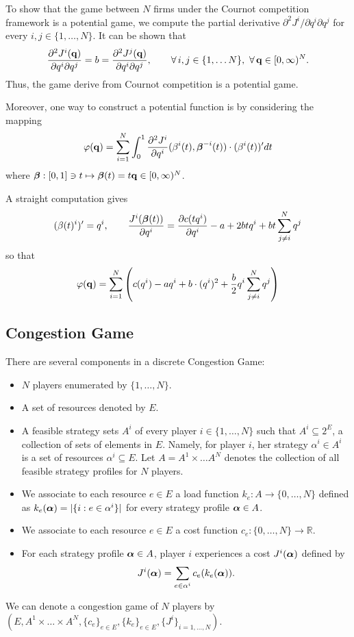 To show that the game between $N$ firms under the Cournot competition framework is a potential game, we compute the partial derivative $\partial^2 J^i/ \partial q^i \partial q^j$ for every $i,j \in \{1,\ldots, N\}$.
It can be shown that
\begin{equation*}
	\frac{\partial^2 J^i(\mathbf{q})}{\partial q^i \partial q^j} = b = 	\frac{\partial^2 J^j(\mathbf{q})}{\partial q^i \partial q^j} , \qquad \forall \, i,j \in \{1,\ldots N\}, \  \forall \, \mathbf{q} \in [0,\infty)^N.
\end{equation*}
Thus, the game derive from Cournot competition is a potential game.

Moreover, one way to construct a potential function is by considering the mapping
$$
	\varphi(\mathbf{q}) = \sum_{i=1}^N \int_0^1 	\frac{\partial^2 J^i}{\partial q^i}(\beta^i(t), \boldsymbol{\beta}^{-i}(t)) \cdot (\beta^i(t))' dt 
$$
where $\boldsymbol{\beta}: [0,1] \ni t \mapsto \boldsymbol{\beta}(t) = t\mathbf{q} \in [0,\infty)^N$.

A straight computation gives
$$
	(\beta(t)^i)' = q^i, \qquad \frac{J^i(\boldsymbol{\beta}(t))}{\partial q^i} = \frac{\partial c(t q^i)}{\partial q^i}  - a + 2b t q^i + bt \sum_{j\neq i}^N q^j
$$
so that
$$
	\varphi(\mathbf{q}) = \sum_{i=1}^N \left(c(q^i) - a q^i + b \cdot (q^i)^2 + \frac{b}{2} q^i \sum_{j\neq i}^N q^j \right)
$$

\subsection{Congestion Game}

There are several components in a discrete Congestion Game:
\begin{itemize}
	\item $N$ players enumerated by $\{1,\ldots, N\}$.
	\item A set of resources denoted by $E$.
	\item A feasible strategy sets $A^i$ of every player $i \in \{1,\ldots, N\}$ such that $A^{i} \subseteq 2^E$, a collection of sets of elements in $E$.  Namely, for player $i$, her strategy $\alpha^i \in A^i$ is a set of resources $\alpha^i \subseteq E$. Let  $A = A^1 \times \ldots A^N$ denotes the collection of all feasible strategy profiles for $N$ players.
	\item We associate to each resource $e \in E$ a load function $k_e: A \to \{0,\ldots, N\}$ defined as $k_e(\boldsymbol{\alpha}) = | \{i : e \in \alpha^i\} |$ for every strategy profile $\boldsymbol{\alpha} \in A$.
	\item We associate to each resource $e \in E$ a cost function $c_e : \{0,\ldots, N\} \to \mathbb{R}$.
	\item For each strategy profile $\boldsymbol{\alpha} \in A$, player $i$ experiences a cost $J^i(\boldsymbol{\alpha})$ defined by
	\begin{equation}
		J^i(\boldsymbol{\alpha}) = \sum_{e \in \alpha^i} c_e(k_e(\boldsymbol{\alpha})).
	\end{equation}
\end{itemize}
We can denote a congestion game of $N$ players by $(E, A^1 \times \ldots  \times A^N, \{c_e\}_{e\in E}, \{k_e\}_{e\in E}, \{J^i\}_{i=1,\ldots,N})$.\\

